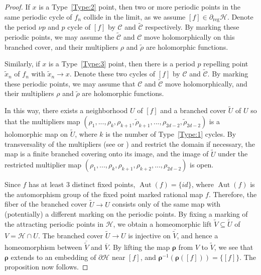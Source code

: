 \documentclass[11pt, reqno]{amsart}
\numberwithin{equation}{section}
\theoremstyle{plain}
\theoremstyle{theorem}
\theoremstyle{plain}
\theoremstyle{definition}
\DeclareMathOperator{\Aut}{Aut}
\numberwithin{figure}{section}
\begin{document}
\begin{proof}
    If $x$ is a Type~\ref{Type:2} point, then two or more periodic points in the same periodic cycle of $f_n$ collide in the limit, as we assume $[f] \in \partial_{\operatorname{reg}}\mathcal{H}$.
    Denote the period $\nu p$ and $p$ cycle of $[f]$ by $\mathcal{C}$ and $\widetilde{\mathcal{C}}$ respectively.
    By marking these periodic points, we may assume the $\widetilde{\mathcal{C}}$ and $\mathcal{C}$ move holomorphically on this branched cover, and their multipliers $\rho$ and $\widetilde{\rho}$ are holomorphic functions.

    Similarly, if $x$ is a Type~\ref{Type:3} point, then there is a period $p$ repelling point $\tilde{x}_n$ of $f_n$ with $\tilde{x}_n \to x$.
    Denote these two cycles of $[f]$ by $\mathcal{C}$ and $\widetilde{\mathcal{C}}$.
    By marking these periodic points, we may assume that $\mathcal{C}$ and $\widetilde{\mathcal{C}}$ move holomorphically, and their multipliers $\rho$ and $\widetilde{\rho}$ are holomorphic functions.

    In this way, there exists a neighborhood $U$ of $[f]$ and a branched cover $\widetilde{U}$ of $U$ so that the multipliers map $(\rho_1,..., \rho_k, \rho_{k+1}, \widetilde{\rho}_{k+1},..., \rho_{2d-2}, \widetilde{\rho}_{2d-2})$ is a holomorphic map on $\widetilde{U}$, where $k$ is the number of Type~\ref{Type:1} cycles.
    By transversality of the multipliers (see \cite[Theorem 6]{Lev10} or \cite{Eps09}) and restrict the domain if necessary, the map is a finite branched covering onto its image, and the image of $\widetilde{U}$ under the restricted multiplier map $(\rho_1,..., \rho_k, \rho_{k+1}, \rho_{k+2}, ..., \rho_{2d-2})$ is open.

    Since $f$ has at least $3$ distinct fixed points, $\Aut(f) = \{id\}$, where $\Aut(f)$ is the automorphism group of the fixed point marked rational map $f$.
    Therefore, the fiber of the branched cover $\widetilde{U} \longrightarrow U$ consists only of the same map with (potentially) a different marking on the periodic points.
    By fixing a marking of the attracting periodic points in $\mathcal{H}$, we obtain a homeomorphic lift $\widetilde{V} \subseteq \widetilde{U}$ of $V = \mathcal{H}\cap U$.
    The branched cover $\widetilde{U} \longrightarrow U$ is injective on $\overline{\widetilde{V}}$, and hence a homeomorphism between $\overline{\widetilde{V}}$ and $\overline{V}$.
    By lifting the map $\boldsymbol{\rho}$ from $V$ to $\widetilde{V}$, we see that $\boldsymbol{\rho}$ extends to an embedding of $\partial{\mathcal{H}}$ near $[f]$, and $\boldsymbol{\rho}^{-1}(\boldsymbol{\rho}([f])) = \{[f]\}$.
    The proposition now follows.
    \end{proof}
\end{document}
